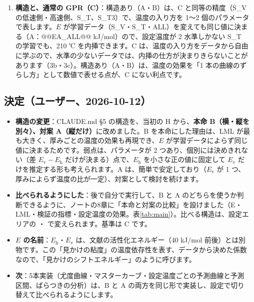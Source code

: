 \documentclass[paper=a4paper,fontsize=10.5pt,line_length=44zw,number_of_lines=38]{jlreq}
\newcommand{\file}[1]{\texttt{\detokenize{#1}}}
\newcommand{\Eh}{E_{\mathrm{h}}}
\newcommand{\Ev}{E_{\mathrm{v}}}
\newenvironment{points}{\begin{itemize}[label=$\triangleright$,leftmargin=1.5\zw,itemsep=0.3ex,topsep=0.5ex,parsep=0pt]}{\end{itemize}}
\newcommand{\pt}[1]{\item \textbf{#1}：}
\begin{document}
\begin{enumerate}[itemsep=0.6ex,topsep=0.6ex]
\item \textbf{構造と、通常の GPR（C）}：構造あり（A・B）は、C と同等の精度（S\_V の低速側・高速側、S\_T、S\_T3）で、温度の入り方を 1〜2 個のパラメータで表します。$E$ が学習データ（S\_V・S\_T・ALL）を変えても同じ値に決まる（A：@@EA_ALL@@ kJ/mol）ので、設定温度が 2 水準しかない S\_T の学習でも、210 ℃ を内挿できます。C は、温度の入り方をデータから自由に学ぶので、水準の少ないデータでは、内挿の仕方が決まりきらないことがあります（3b・3c）。構造あり（A・B）は、温度の効果を「1 本の曲線のずらし方」として数値で表せる点が、C にない利点です。
\end{enumerate}

\subsection{決定（ユーザー、2026-10-12）}
\begin{points}
\pt{構造の変更}CLAUDE.md §5 の構造を、当初の H から、\textbf{本命 B（横・縦を別々）、対案 A（縦だけ）}に改めました。B を本命にした理由は、LML が最も大きく、厚みごとの温度の効果も再現でき、$E$ が学習データによらず同じ値に決まるためです。弱点は、パラメータが 2 つあり、個別には決めきれない（差 $\Ev-\Eh$ だけが決まる）点で、$\Eh$ を小さな正の値に固定して $\Ev$ だけを推定する形も考えられます。A は、簡単で安定しており（$\Ev$ が 1 つ、厚みによらず温度の比が一定）、対案として検討を続けます。
\pt{比べられるようにした}後で自分で実行して、B と A のどちらを使うか判断できるように、ノートの8章に「本命と対案の比較」を設けました（E・LML・検証の指標・設定温度の効果。表\ref{tab:main}）。比べる構造は、設定エリアの \file{MAIN_STRUCT}・\file{ALT_STRUCT} で変えられます。基準は C です。
\pt{$E$ の名前}$\Eh$・$\Ev$ は、文献の活性化エネルギー（40 kJ/mol 前後）とは別物です。この「見かけの粘度」の温度依存性を表す、データから決めた係数なので、「見かけのシフトエネルギー」のように呼びます。
\pt{次}5本実装（尤度曲線・マスターカーブ・設定温度ごとの予測曲線と予測区間、ばらつきの分析）は、B と A の両方を同じ形で実装し、設定で切り替えて比べられるようにします。
\end{points}
\end{document}
